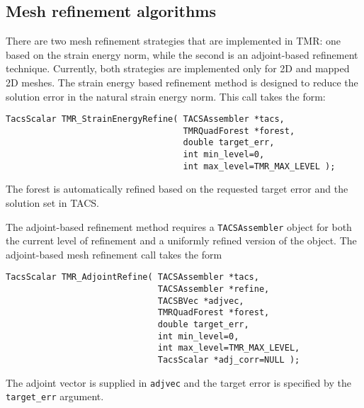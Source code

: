\documentclass[12pt]{article}
\begin{document}
\subsection{Mesh refinement algorithms}

There are two mesh refinement strategies that are implemented in TMR: one based on the strain energy norm, while the second is an adjoint-based refinement technique.
Currently, both strategies are implemented only for 2D and mapped 2D meshes.
The strain energy based refinement method is designed to reduce the solution error in the natural strain energy norm.
This call takes the form:
%
\begin{verbatim}
TacsScalar TMR_StrainEnergyRefine( TACSAssembler *tacs,
                                   TMRQuadForest *forest,
                                   double target_err,
                                   int min_level=0, 
                                   int max_level=TMR_MAX_LEVEL );
\end{verbatim}
%
The forest is automatically refined based on the requested target error and the solution set in TACS.

The adjoint-based refinement method requires a \texttt{TACSAssembler} object for both the current level of refinement and a uniformly refined version of the object. 
The adjoint-based mesh refinement call takes the form
\begin{verbatim}
TacsScalar TMR_AdjointRefine( TACSAssembler *tacs,
                              TACSAssembler *refine,
                              TACSBVec *adjvec,
                              TMRQuadForest *forest,
                              double target_err,
                              int min_level=0, 
                              int max_level=TMR_MAX_LEVEL,
                              TacsScalar *adj_corr=NULL );
\end{verbatim}
The adjoint vector is supplied in \texttt{adjvec} and the target error is specified by the \texttt{target\_err} argument.



\end{document}
